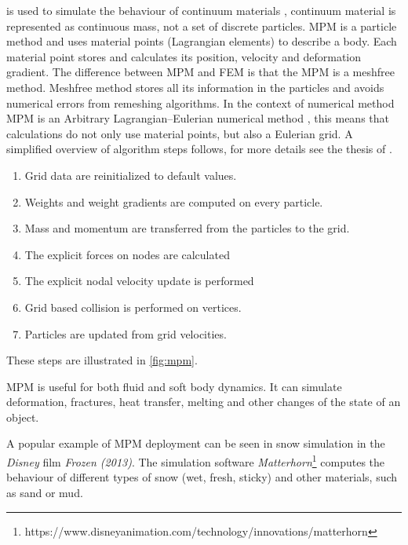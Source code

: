 is used to simulate the behaviour of continuum materials , continuum material is represented as continuous mass, not a set of discrete particles. MPM is a particle method \todo and uses material points (Lagrangian elements) to describe a body. Each material point stores and calculates its position, velocity and deformation gradient. The difference between MPM and FEM is that the MPM is a meshfree method. Meshfree method stores all its information in the particles and avoids numerical errors from remeshing algorithms. In the context of numerical method MPM is an Arbitrary Lagrangian–Eulerian numerical method \cite{ALE}, this means that calculations do not only use material points, but also a Eulerian grid. A simplified overview of algorithm steps follows, for more details see the thesis of \citet{jiang2015material}.

\begin{enumerate}
    \item Grid data are reinitialized to default values.
    \item Weights and weight gradients are computed on every particle.
    \item Mass and momentum are transferred from the particles to the grid.
    \item The explicit forces on nodes are calculated
    \item The explicit nodal velocity update is performed
    \item Grid based collision is performed on vertices.
    \item Particles are updated from grid velocities.
\end{enumerate}
These steps are illustrated in \cref{fig:mpm}.

MPM is useful for both fluid and soft body dynamics. It can simulate deformation, fractures, heat transfer, melting and other changes of the state of an object.

A popular example of MPM deployment can be seen in snow simulation in the \emph{Disney} film \emph{Frozen (2013)}. The simulation software \emph{Matterhorn}\footnote{https://www.disneyanimation.com/technology/innovations/matterhorn} computes the behaviour of different types of snow (\eg wet, fresh, sticky) and other materials, such as sand or mud.

